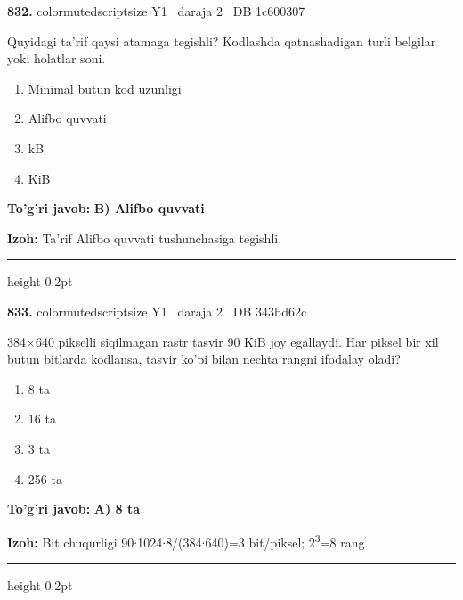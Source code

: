 \documentclass[10pt,a4paper,oneside]{article}
\begin{document}
\noindent\textbf{\color{ink}832.}  {color{muted}scriptsize Y1 \textbullet\ daraja 2 \textbullet\ DB 1c600307}
\par
Quyidagi ta'rif qaysi atamaga tegishli? Kodlashda qatnashadigan turli belgilar yoki holatlar soni.
\begin{enumerate}[label=\Alph*),leftmargin=9mm]
\item Minimal butun kod uzunligi
\item Alifbo quvvati
\item kB
\item KiB
\end{enumerate}
\begin{tcolorbox}[enhanced,breakable,colback=teal!4,colframe=teal!50!black,boxrule=0.5pt,arc=1.1mm,left=3mm,right=3mm,top=1.7mm,bottom=1.7mm,before skip=2mm,after skip=2mm]
\textbf{\color{teal}To'g'ri javob:} \textbf{B) Alifbo quvvati}
\par\smallskip
\textbf{Izoh:} Ta'rif Alifbo quvvati tushunchasiga tegishli.
\end{tcolorbox}
\vspace{2mm}\hrule height 0.2pt \vspace{3mm}

\noindent\textbf{\color{ink}833.}  {color{muted}scriptsize Y1 \textbullet\ daraja 2 \textbullet\ DB 343bd62c}
\par
384\ensuremath{\times}640 pikselli siqilmagan rastr tasvir 90 KiB joy egallaydi. Har piksel bir xil butun bitlarda kodlansa, tasvir ko'pi bilan nechta rangni ifodalay oladi?
\begin{enumerate}[label=\Alph*),leftmargin=9mm]
\item 8 ta
\item 16 ta
\item 3 ta
\item 256 ta
\end{enumerate}
\begin{tcolorbox}[enhanced,breakable,colback=teal!4,colframe=teal!50!black,boxrule=0.5pt,arc=1.1mm,left=3mm,right=3mm,top=1.7mm,bottom=1.7mm,before skip=2mm,after skip=2mm]
\textbf{\color{teal}To'g'ri javob:} \textbf{A) 8 ta}
\par\smallskip
\textbf{Izoh:} Bit chuqurligi 90\ensuremath{\cdot}1024\ensuremath{\cdot}8/(384\ensuremath{\cdot}640)=3 bit/piksel; 2\textsuperscript{3}=8 rang.
\end{tcolorbox}
\vspace{2mm}\hrule height 0.2pt \vspace{3mm}
\end{document}
